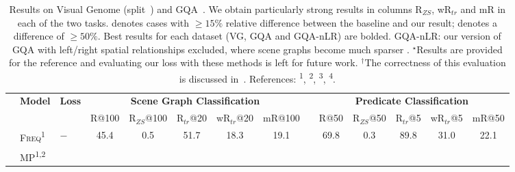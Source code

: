 \begin{table}[t]
	\caption{\small Results on Visual Genome (split~\citep{xu2017scene}) and GQA~\citep{hudson2019gqa}. We obtain particularly strong results in columns R$_{ZS}$, wR$_{tr}$ and mR in each of the two tasks. \crule[bad]{12pt}{8pt} denotes cases with $\geq 15\%$ relative difference between the baseline and our result; \crule[extreme]{12pt}{8pt} denotes a difference of $\geq 50\%$. Best results for each dataset (VG, GQA and GQA-nLR) are bolded.
		GQA-nLR: our version of GQA with left/right spatial relationships excluded, where scene graphs become much sparser 
		. $^\star$Results are provided for the reference and evaluating our loss with these methods is left for future work. %
		$^\dagger$The correctness of this evaluation is discussed in~\citep{tang2020github}.
		References: \textsuperscript{1}\citep{zellers2018neural},
		\textsuperscript{2}\citep{xu2017scene},
		\textsuperscript{3}\citep{chen2019knowledge},
		\textsuperscript{4}\citep{zhang2019graphical}.}\label{table:main_results}
	\vspace{-10pt}
	\scriptsize
	\setlength{\tabcolsep}{0.4pt}
	\begin{center}
		\begin{tabular}{p{0.7cm}|llcccccp{0.1cm}ccccc}
			\toprule
			\multirow{2}{*}{\rotatebox[origin=c]{90}{\hspace{1pt}\centering\tiny\parbox{0.85cm}{\vspace{0pt}\textbf{Dataset}}}} & \multirow{2}{*}{\textbf{Model}} & \multirow{2}{*}{\textbf{Loss}} & \multicolumn{5}{c}{\textbf{Scene Graph Classification}} & & \multicolumn{5}{c}{\textbf{Predicate Classification}}\Tstrut\Bstrut\\
			\cline{4-8}\cline{10-14}
			& & & \tiny R@100 & \tiny R$_{ZS}$@100 & \tiny R$_{tr}$@20& \tiny wR$_{tr}$@20 & \tiny mR@100 &
			& \tiny R@50 & \tiny R$_{ZS}$@50 & \tiny R$_{tr}$@5 & \tiny wR$_{tr}$@5 & \tiny mR@50 \Tstrut \Bstrut\\
			\midrule
			\multirow{8}{*}{\rotatebox[origin=c]{90}{\hspace{-10pt}\parbox{1.1cm}{\centering\tiny\textbf{Visual Genome}}}}
			& \textsc{Freq}\textsuperscript{1} & $-$ & 45.4 & 0.5 & 51.7 & 18.3 & 19.1 & & 69.8 & 0.3 & 89.8 & 31.0 & 22.1 \Tstrut \Bstrut\\ 
			\cline{2-14}
			& \multirow{2}{*}{MP\textsuperscript{1,2}}

\end{tabular}
\end{center}
\end{table}
